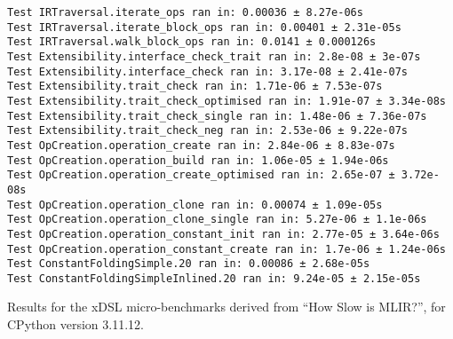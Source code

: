 \begin{code}
    \begin{verbatim}
Test IRTraversal.iterate_ops ran in: 0.00036 ± 8.27e-06s
Test IRTraversal.iterate_block_ops ran in: 0.00401 ± 2.31e-05s
Test IRTraversal.walk_block_ops ran in: 0.0141 ± 0.000126s
Test Extensibility.interface_check_trait ran in: 2.8e-08 ± 3e-07s
Test Extensibility.interface_check ran in: 3.17e-08 ± 2.41e-07s
Test Extensibility.trait_check ran in: 1.71e-06 ± 7.53e-07s
Test Extensibility.trait_check_optimised ran in: 1.91e-07 ± 3.34e-08s
Test Extensibility.trait_check_single ran in: 1.48e-06 ± 7.36e-07s
Test Extensibility.trait_check_neg ran in: 2.53e-06 ± 9.22e-07s
Test OpCreation.operation_create ran in: 2.84e-06 ± 8.83e-07s
Test OpCreation.operation_build ran in: 1.06e-05 ± 1.94e-06s
Test OpCreation.operation_create_optimised ran in: 2.65e-07 ± 3.72e-08s
Test OpCreation.operation_clone ran in: 0.00074 ± 1.09e-05s
Test OpCreation.operation_clone_single ran in: 5.27e-06 ± 1.1e-06s
Test OpCreation.operation_constant_init ran in: 2.77e-05 ± 3.64e-06s
Test OpCreation.operation_constant_create ran in: 1.7e-06 ± 1.24e-06s
Test ConstantFoldingSimple.20 ran in: 0.00086 ± 2.68e-05s
Test ConstantFoldingSimpleInlined.20 ran in: 9.24e-05 ± 2.15e-05s
    \end{verbatim}
    \caption{Results for the xDSL micro-benchmarks derived from ``How Slow is MLIR?'', for CPython version 3.11.12.}
    \label{listing:how-slow-is-mlir-xdsl-microbenchmark-results-311}
\end{code}



